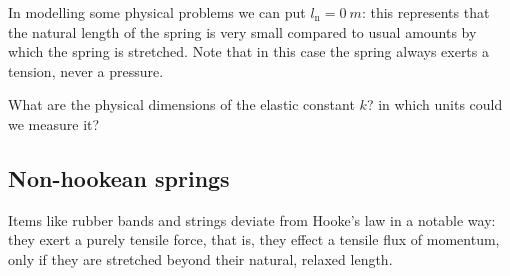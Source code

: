\documentclass[a4paper,12pt,%
onecolumn,oneside,titlepage,%
british%
]{memoir}
\renewcommand*{\|}[1][]{\nonscript\:#1\vert\nonscript\:\mathopen{}}
\newcommand*{\ylo}{l_{\textrm{n}}}
\begin{document}
In modelling some physical problems we can put $\ylo=\qty{0}{m}$: this represents that the natural length of the spring is very small compared to usual amounts by which the spring is stretched. Note that in this case the spring always exerts a tension, never a pressure.

\begin{exercise}
  What are the physical dimensions of the elastic constant $k$? in which units could we measure it?
\end{exercise}

\subsection{Non-hookean springs}
\label{sec:nonhooke}

Items like rubber bands and strings deviate from Hooke's law in a notable way: they exert a purely tensile force, that is, they effect a tensile flux of momentum, only if they are stretched beyond their natural, relaxed length.
\end{document}
